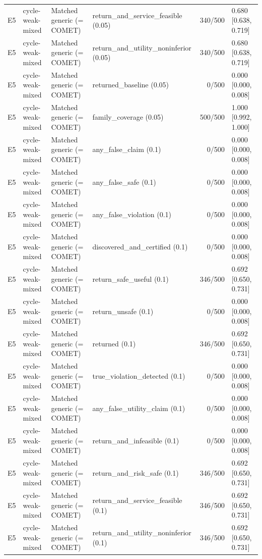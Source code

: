 \begin{longtable}{p{.04\linewidth}p{.18\linewidth}p{.19\linewidth}p{.16\linewidth}r p{.21\linewidth}}
E5 & cycle-weak-mixed & Matched generic (= COMET) & return\_and\_service\_feasible (0.05) & 340/500 & 0.680 [0.638, 0.719]\\
E5 & cycle-weak-mixed & Matched generic (= COMET) & return\_and\_utility\_noninferior (0.05) & 340/500 & 0.680 [0.638, 0.719]\\
E5 & cycle-weak-mixed & Matched generic (= COMET) & returned\_baseline (0.05) & 0/500 & 0.000 [0.000, 0.008]\\
E5 & cycle-weak-mixed & Matched generic (= COMET) & family\_coverage (0.05) & 500/500 & 1.000 [0.992, 1.000]\\
E5 & cycle-weak-mixed & Matched generic (= COMET) & any\_false\_claim (0.1) & 0/500 & 0.000 [0.000, 0.008]\\
E5 & cycle-weak-mixed & Matched generic (= COMET) & any\_false\_safe (0.1) & 0/500 & 0.000 [0.000, 0.008]\\
E5 & cycle-weak-mixed & Matched generic (= COMET) & any\_false\_violation (0.1) & 0/500 & 0.000 [0.000, 0.008]\\
E5 & cycle-weak-mixed & Matched generic (= COMET) & discovered\_and\_certified (0.1) & 0/500 & 0.000 [0.000, 0.008]\\
E5 & cycle-weak-mixed & Matched generic (= COMET) & return\_safe\_useful (0.1) & 346/500 & 0.692 [0.650, 0.731]\\
E5 & cycle-weak-mixed & Matched generic (= COMET) & return\_unsafe (0.1) & 0/500 & 0.000 [0.000, 0.008]\\
E5 & cycle-weak-mixed & Matched generic (= COMET) & returned (0.1) & 346/500 & 0.692 [0.650, 0.731]\\
E5 & cycle-weak-mixed & Matched generic (= COMET) & true\_violation\_detected (0.1) & 0/500 & 0.000 [0.000, 0.008]\\
E5 & cycle-weak-mixed & Matched generic (= COMET) & any\_false\_utility\_claim (0.1) & 0/500 & 0.000 [0.000, 0.008]\\
E5 & cycle-weak-mixed & Matched generic (= COMET) & return\_and\_infeasible (0.1) & 0/500 & 0.000 [0.000, 0.008]\\
E5 & cycle-weak-mixed & Matched generic (= COMET) & return\_and\_risk\_safe (0.1) & 346/500 & 0.692 [0.650, 0.731]\\
E5 & cycle-weak-mixed & Matched generic (= COMET) & return\_and\_service\_feasible (0.1) & 346/500 & 0.692 [0.650, 0.731]\\
E5 & cycle-weak-mixed & Matched generic (= COMET) & return\_and\_utility\_noninferior (0.1) & 346/500 & 0.692 [0.650, 0.731]\\

\end{longtable}
